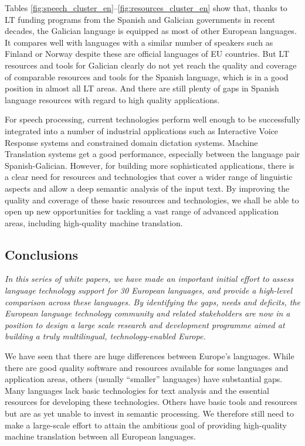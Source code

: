 \begin{multicols}{2}
Tables \ref{fig:speech_cluster_en}--\ref{fig:resources_cluster_en} show that, thanks to LT funding programs from the Spanish and Galician governments in recent decades, the Galician language is equipped as most of other European languages. It compares well with languages with a similar number of speakers such as Finland or Norway despite these are official languages of EU countries. But LT resources and tools for Galician clearly do not yet reach the quality and coverage of comparable resources and tools for the Spanish language, which is in a good position in almost all LT areas. And there are still plenty of gaps in Spanish language resources with regard to high quality applications.

    For speech processing, current technologies perform well enough to be successfully integrated into a number of industrial applications such as Interactive Voice Response systems and constrained domain dictation systems. Machine Translation systems get a good performance, especially between the language pair Spanish-Galician. However, for building more sophisticated applications, there is a clear need for resources and technologies that cover a wider range of linguistic aspects and allow a deep semantic analysis of the input text. By improving the quality and coverage of these basic resources and technologies, we shall be able to open up new opportunities for tackling a vast range of advanced application areas, including high-quality machine translation.

\subsection{Conclusions}

\emph{In this series of white papers, we have made an important initial effort to assess language technology support for 30 European languages, and provide a high-level comparison across these languages. By identifying the gaps, needs and deficits, the European language technology community and related stakeholders are now in a position to design a large scale research and development programme aimed at building a truly multilingual, technology-enabled Europe.}

We have seen that there are huge differences between Europe’s languages. While there are good quality software and resources available for some languages and application areas, others (usually “smaller” languages) have substantial gaps. Many languages lack basic technologies for text analysis and the essential resources for developing these technologies. Others have basic tools and resources but are as yet unable to invest in semantic processing. We therefore still need to make a large-scale effort to attain the ambitious goal of providing high-quality machine translation between all European languages. 


\end{multicols}
